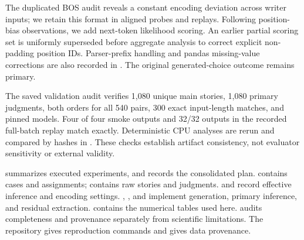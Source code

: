 The duplicated BOS audit reveals a constant encoding deviation across writer inputs; we retain this format in aligned probes and replays. Following position-bias observations, we add next-token likelihood scoring. An earlier partial scoring set is uniformly superseded before aggregate analysis to correct explicit non-padding position IDs. Parser-prefix handling and pandas missing-value corrections are also recorded in . The original generated-choice outcome remains primary.

The saved validation audit verifies 1,080 unique main stories, 1,080 primary judgments, both orders for all 540 pairs, 300 exact input-length matches, and pinned models. Four of four smoke outputs and 32/32 outputs in the recorded full-batch replay match exactly. Deterministic CPU analyses are rerun and compared by hashes in . These checks establish artifact consistency, not evaluator sensitivity or external validity.

 summarizes executed experiments, and  records the consolidated plan.  contains cases and assignments;  contains raw stories and judgments.  and  record effective inference and encoding settings. , , and  implement generation, primary inference, and residual extraction.  contains the numerical tables used here.  audits completeness and provenance separately from scientific limitations. The repository  gives reproduction commands and  gives data provenance.
